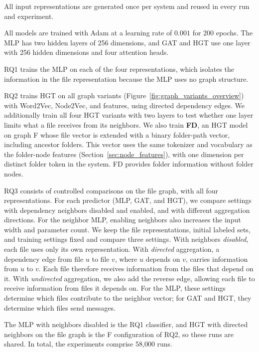 All input representations are generated once per system and reused in every run and experiment.

All models are trained with Adam at a learning rate of $0.001$ for 200 epochs. The MLP has two hidden layers of 256 dimensions, and GAT and HGT use one layer with 256 hidden dimensions and four attention heads.

RQ1 trains the MLP on each of the four representations, which isolates the information in the file representation because the MLP uses no graph structure.

RQ2 trains HGT on all graph variants (Figure~\ref{fig:graph_variants_overview}) with Word2Vec, Node2Vec, and \ft{} features, using directed dependency edges. We additionally train all four HGT variants with two layers to test whether one layer limits what a file receives from its neighbors. We also train \textbf{FD}, an HGT model on graph F whose \ft{} file vector is extended with a binary folder-path vector, including ancestor folders. This vector uses the same tokenizer and vocabulary as the folder-node features (Section~\ref{sec:node_features}), with one dimension per distinct folder token in the system. FD provides folder information without folder nodes.

RQ3 consists of controlled comparisons on the file graph, with all four representations. For each predictor (MLP, GAT, and HGT), we compare settings with dependency neighbors disabled and enabled, and with different aggregation directions. For the neighbor MLP, enabling neighbors also increases the input width and parameter count. We keep the file representations, initial labeled sets, and training settings fixed and compare three settings. With neighbors \emph{disabled}, each file uses only its own representation. With \emph{directed} aggregation, a dependency edge from file $u$ to file $v$, where $u$ depends on $v$, carries information from $u$ to $v$. Each file therefore receives information from the files that depend on it. With \emph{undirected} aggregation, we also add the reverse edge, allowing each file to receive information from files it depends on. For the MLP, these settings determine which files contribute to the neighbor vector; for GAT and HGT, they determine which files send messages.

The MLP with neighbors disabled is the RQ1 classifier, and HGT with directed neighbors on the file graph is the F configuration of RQ2, so these runs are shared. In total, the experiments comprise 58,000 runs.

